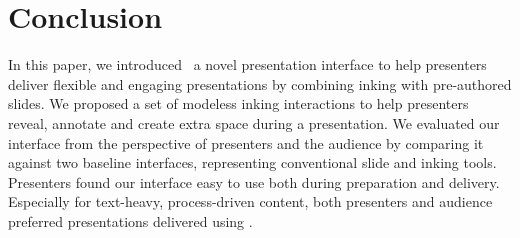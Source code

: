 \section{Conclusion}
In this paper, we introduced \interface\ a novel presentation interface to help presenters deliver flexible and engaging presentations by combining inking with pre-authored slides. We proposed a set of modeless inking interactions to help presenters reveal, annotate and create extra space during a presentation. We evaluated our interface from the perspective of presenters and the audience by comparing it against two baseline interfaces, representing conventional slide and inking tools. Presenters found our interface easy to use both during preparation and delivery. Especially for text-heavy, process-driven content, both presenters and audience preferred presentations delivered using \interface.